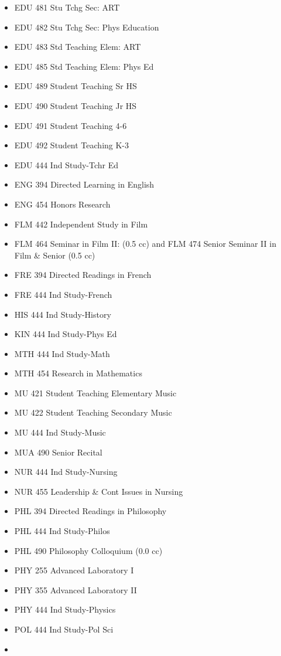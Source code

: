 \documentclass[
  letterpaper,
]{scrbook}
\begin{document}
\begin{itemize}
\item
  EDU 481 Stu Tchg Sec: ART
\item
  EDU 482 Stu Tchg Sec: Phys Education
\item
  EDU 483 Std Teaching Elem: ART
\item
  EDU 485 Std Teaching Elem: Phys Ed
\item
  EDU 489 Student Teaching Sr HS
\item
  EDU 490 Student Teaching Jr HS
\item
  EDU 491 Student Teaching 4-6
\item
  EDU 492 Student Teaching K-3
\item
  EDU 444 Ind Study-Tchr Ed
\item
  ENG 394 Directed Learning in English
\item
  ENG 454 Honors Research
\item
  FLM 442 Independent Study in Film
\item
  FLM 464 Seminar in Film II: (0.5 cc) and FLM 474 Senior Seminar II in
  Film \& Senior (0.5 cc)
\item
  FRE 394 Directed Readings in French
\item
  FRE 444 Ind Study-French
\item
  HIS 444 Ind Study-History
\item
  KIN 444 Ind Study-Phys Ed
\item
  MTH 444 Ind Study-Math
\item
  MTH 454 Research in Mathematics
\item
  MU 421 Student Teaching Elementary Music
\item
  MU 422 Student Teaching Secondary Music
\item
  MU 444 Ind Study-Music
\item
  MUA 490 Senior Recital
\item
  NUR 444 Ind Study-Nursing
\item
  NUR 455 Leadership \& Cont Issues in Nursing
\item
  PHL 394 Directed Readings in Philosophy
\item
  PHL 444 Ind Study-Philos
\item
  PHL 490 Philosophy Colloquium (0.0 cc)
\item
  PHY 255 Advanced Laboratory I
\item
  PHY 355 Advanced Laboratory II
\item
  PHY 444 Ind Study-Physics
\item
  POL 444 Ind Study-Pol Sci
\item

\end{itemize}
\end{document}
